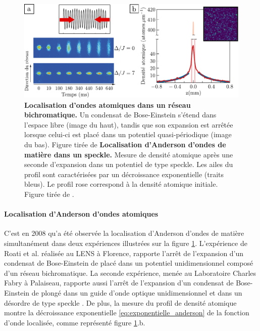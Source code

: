 \begin{figure}
\centering
\includegraphics[width=\textwidth]{Fig/Localisation/localisation_1D_atomes.pdf}
\caption{\textbf{Localisation d'ondes atomiques dans un réseau bichromatique.} Un condensat de Bose-Einstein s'étend dans l'espace libre (image du haut), tandis que son expansion est arrêtée lorsque celui-ci est placé dans un potentiel quasi-périodique (image du bas). Figure tirée de \citep{roati2008anderson} \textbf{Localisation d'Anderson d'ondes de matière dans un speckle.} Mesure de densité atomique après une seconde d'expansion dans un potentiel de type speckle. Les ailes du profil sont caractérisées par un décroissance exponentielle (traits bleus). Le profil rose correspond à la densité atomique initiale. Figure tirée de \citep{billy2008direct}.}
\label{fig:localisation_1D_atomes_froids}
\end{figure}




\paragraph*{Localisation d'Anderson d'ondes atomiques}
C'est en 2008 qu'a été observée la localisation d'Anderson d'ondes de matière simultanément dans deux expériences illustrées sur la figure \ref{fig:localisation_1D_atomes_froids}. L'expérience de Roati et al. \citep{roati2008anderson} réalisée au LENS à Florence, rapporte l'arrêt de l'expansion d'un condensat de Bose-Einstein de  placé dans un potentiel unidimensionnel composé d'un réseau bichromatique. La seconde expérience, menée au Laboratoire Charles Fabry à Palaiseau, rapporte aussi l'arrêt de l'expansion d'un condensat de Bose-Einstein de  plongé dans un guide d'onde optique unidimensionnel et dans un désordre de type speckle \citep{billy2008direct}. De plus, la mesure du profil de densité atomique montre la décroissance exponentielle \ref{eq:exponentielle_anderson} de la fonction d'onde localisée, comme représenté figure \ref{fig:localisation_1D_atomes_froids}.b. 

